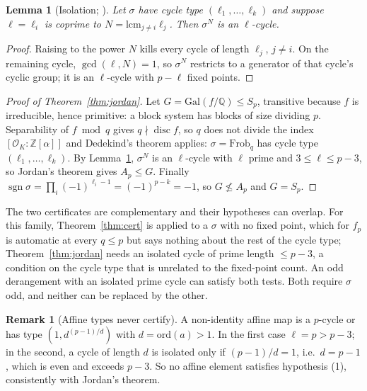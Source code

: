 \documentclass[11pt,a4paper]{amsart}
\newcommand{\Q}{\mathbb{Q}}
\newcommand{\Z}{\mathbb{Z}}
\newcommand{\Gal}{\mathrm{Gal}}
\newcommand{\disc}{\operatorname{disc}}
\newcommand{\sgn}{\operatorname{sgn}}
\newcommand{\Frob}{\mathrm{Frob}}
\theoremstyle{plain}
\newtheorem{lemma}[theorem]{Lemma}
\theoremstyle{definition}
\newtheorem{remark}[theorem]{Remark}
\begin{document}
\begin{lemma}[Isolation; {\cite[Comments 1]{JonesCycle}}]
\label{lem:isolate}
Let \(\sigma\) have cycle type \((\ell_1,\dots,\ell_k)\) and suppose \(\ell=\ell_i\) is coprime to \(N=\mathrm{lcm}_{j\ne i}\ell_j\). Then \(\sigma^{N}\) is an \(\ell\)-cycle.
\end{lemma}

\begin{proof}
Raising to the power \(N\) kills every cycle of length \(\ell_j\), \(j\ne i\). On the remaining cycle, \(\gcd(\ell,N)=1\), so \(\sigma^N\) restricts to a generator of that cycle's cyclic group; it is an \(\ell\)-cycle with \(p-\ell\) fixed points.
\end{proof}

\begin{proof}[Proof of Theorem~\ref{thm:jordan}]
Let \(G=\Gal(f/\Q)\le S_p\), transitive because \(f\) is irreducible, hence primitive: a block system has blocks of size dividing \(p\). Separability of \(f\bmod q\) gives \(q\nmid\disc f\), so \(q\) does not divide the index \([\mathcal O_K:\Z[\alpha]]\) and Dedekind's theorem \cite[Thm.~1]{ConradFactor} applies: \(\sigma=\Frob_q\) has cycle type \((\ell_1,\dots,\ell_k)\). By Lemma~\ref{lem:isolate}, \(\sigma^N\) is an \(\ell\)-cycle with \(\ell\) prime and \(3\le\ell\le p-3\), so Jordan's theorem \cite[Thm.~13.9]{Wielandt} gives \(A_p\le G\). Finally \(\sgn\sigma=\prod_i(-1)^{\ell_i-1}=(-1)^{p-k}=-1\), so \(G\not\le A_p\) and \(G=S_p\).
\end{proof}

The two certificates are complementary and their hypotheses can overlap. For this family, Theorem~\ref{thm:cert} is applied to a \(\sigma\) with no fixed point, which for \(f_p\) is automatic at every \(q\le p\) but says nothing about the rest of the cycle type; Theorem~\ref{thm:jordan} needs an isolated cycle of prime length \(\le p-3\), a condition on the cycle type that is unrelated to the fixed-point count. An odd derangement with an isolated prime cycle can satisfy both tests. Both require \(\sigma\) odd, and neither can be replaced by the other.

\begin{remark}[Affine types never certify]
\label{rem:affine-jordan}
A non-identity affine map is a \(p\)-cycle or has type \((1,d^{(p-1)/d})\) with \(d=\mathrm{ord}(a)>1\). In the first case \(\ell=p>p-3\); in the second, a cycle of length \(d\) is isolated only if \((p-1)/d=1\), i.e.\ \(d=p-1\), which is even and exceeds \(p-3\). So no affine element satisfies hypothesis (1), consistently with Jordan's theorem.
\end{remark}
\end{document}
